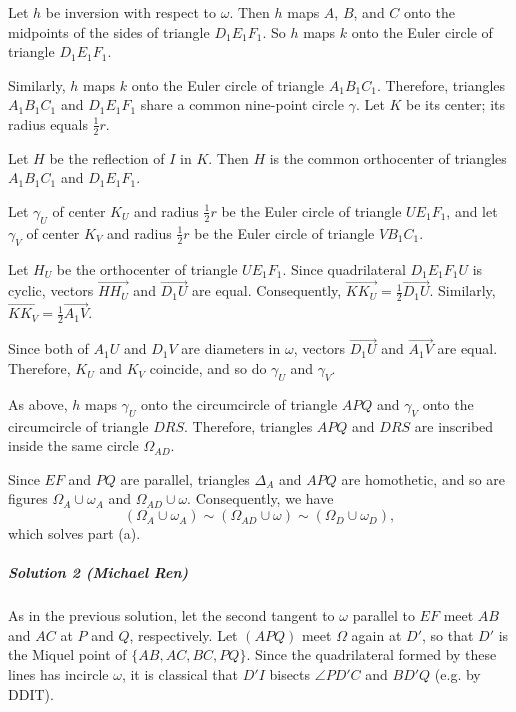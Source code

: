 Let $h$ be inversion with respect to $\omega$. Then $h$ maps $A$, $B$, and $C$ onto the midpoints of the sides of triangle $D_1E_1F_1$. So $h$ maps $k$ onto the Euler circle of triangle $D_1E_1F_1$.

Similarly, $h$ maps $k$ onto the Euler circle of triangle $A_1B_1C_1$.
Therefore, triangles $A_1B_1C_1$ and $D_1E_1F_1$ share a common nine-point
circle $\gamma$. Let $K$ be its center; its radius equals $\frac{1}{2}r$.

Let $H$ be the reflection of $I$ in $K$. Then $H$ is the common orthocenter of triangles $A_1B_1C_1$ and $D_1E_1F_1$.

Let $\gamma_U$ of center $K_U$ and radius $\frac{1}{2}r$ be the Euler circle of
triangle $UE_1F_1$, and let $\gamma_V$ of center $K_V$ and radius $\frac{1}{2}r$ be
the Euler circle of triangle $VB_1C_1$.

Let $H_U$ be the orthocenter of triangle $UE_1F_1$. Since quadrilateral
$D_1E_1F_1U$ is cyclic, vectors $\overrightarrow{HH_U}$ and
$\overrightarrow{D_1U}$ are equal. Consequently,
$\overrightarrow{KK_U}=\frac{1}{2}\overrightarrow{D_1U}$. Similarly,
$\overrightarrow{KK_V}=\frac{1}{2}\overrightarrow{A_1V}$.

Since both of $A_1U$ and $D_1V$ are diameters in $\omega$, vectors
$\overrightarrow{D_1U}$ and $\overrightarrow{A_1V}$ are equal. Therefore, $K_U$
and $K_V$ coincide, and so do $\gamma_U$ and $\gamma_V$.

As above, $h$ maps $\gamma_U$ onto the circumcircle of triangle $APQ$ and
$\gamma_V$ onto the circumcircle of triangle $DRS$. Therefore, triangles $APQ$
and $DRS$ are inscribed inside the same circle $\Omega_{AD}$.

Since $EF$ and $PQ$ are parallel, triangles $\Delta_A$ and $APQ$ are homothetic,
and so are figures $\Omega_A \cup \omega_A$ and $\Omega_{AD}\cup \omega$.
Consequently, we have
\[(\Omega_A\cup \omega_A)\sim (\Omega_{AD}\cup \omega)\sim (\Omega_D\cup
\omega_D),\]
which solves part (a).


\subparagraph{Solution 2 (Michael Ren)} As in the previous solution, let the
second tangent to $\omega$ parallel to $EF$ meet $AB$ and $AC$ at $P$ and $Q$,
respectively. Let $(APQ)$ meet $\Omega$ again at $D'$, so that $D'$ is the
Miquel point of $\{AB, AC, BC, PQ\}$. Since the quadrilateral formed by these
lines has incircle $\omega$, it is classical that $D'I$ bisects $\angle PD'C$
and $BD'Q$ (e.g. by DDIT).


